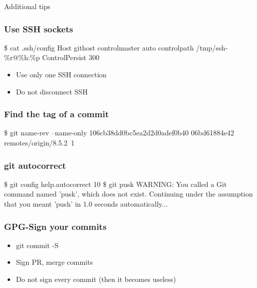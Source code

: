 \begin{frame}
    \begin{center}
        \Huge{Additional tips}
    \end{center}
\end{frame}
\begin{frame}[fragile]
    \frametitle{Use SSH sockets}
\begin{block}{}\begin{semiverbatim}
\$ cat {}.ssh/config
Host githost
    controlmaster auto
    controlpath /tmp/ssh-\%r@\%h:\%p
    ControlPersist 300
\end{semiverbatim}\end{block}
    \begin{itemize}
        \item Use only one SSH connection
        \item Do not disconnect SSH
    \end{itemize}
\end{frame}
\begin{frame}[fragile]
    \frametitle{Find the tag of a commit}

\begin{block}{}\begin{semiverbatim}
\$ git name-rev --name-only 106cb38dd0bc5ea2d2d0adef0b40
06bd61884e42
\color{lightgrey}remotes/origin/8.5.2~1
\end{semiverbatim}\end{block}
\end{frame}
\begin{frame}[fragile]
    \frametitle{git autocorrect}
\begin{block}{}\begin{semiverbatim}
\$ git config help.autocorrect 10\pause
\$ git pusk
\color{lightgrey}WARNING: You called a Git command named \rq{}pusk\rq{}, which does not exist.
Continuing under the assumption that you meant \rq{}push\rq{}
in 1.0 seconds automatically.{}.{}.
\end{semiverbatim}\end{block}
\end{frame}
\begin{frame}
    \frametitle{GPG-Sign your commits}
    \begin{itemize}
        \item git commit -S
        \item Sign PR, merge commits
        \item Do not sign every commit (then it becomes useless)
    \end{itemize}
\end{frame}

